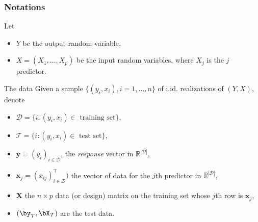 \documentclass{beamer}\usepackage[]{graphicx}\usepackage[]{color}
\begin{document}
\begin{frame}
  \frametitle{Notations}

  Let
  \begin{itemize}
  \item $Y$ be the output random variable,
  \item  $X  =  (X_1,  \dots,  X_p)$  be  the  input  random
    variables, where $X_j$ is the $j$ predictor.
  \end{itemize}

  \vfill

  \begin{block}{The data}
    Given a sample $\{(y_i, x_i), i=1,\dots,n\}$ of i.id. realizations
    of $(Y,X)$, denote
    \begin{itemize}
    \item $\mathcal{D} = \{i:(y_i, x_i) \in \text{ training set}\}$,
    \item $\mathcal{T} = \{i:(y_i, x_i) \in \text{ test set}\}$,
    \item   $\mathbf{y}   =   (y_i)_{i\in\mathcal{D}}$,  the
      \emph{response} vector in $\mathbb{R}^{|\mathcal{D}|}$,
    \item $\mathbf{x}_j =  (x_{ij})_{i\in\mathcal{D}}^\intercal)$ the vector
      of data for the $j$th predictor in $\mathbb{R}^{|\mathcal{D}|}$,
    \item $\mathbf{X}$ the $n\times p$  data (or design) matrix on the
      training set whose $j$th row is $\mathbf{x}_j$,
    \item $(\by_\mathcal{T},\bX_\mathcal{T})$ are the test data.
    \end{itemize}
  \end{block}
\end{frame}
\end{document}
